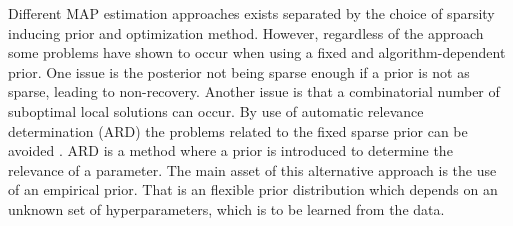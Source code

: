 Different MAP estimation approaches exists separated by the choice of sparsity inducing prior and optimization method. 
However, regardless of the approach some problems have shown to occur when using a fixed and algorithm-dependent prior. 
One issue is the posterior not being sparse enough if a prior is not as sparse, leading to non-recovery. 
Another issue is that a combinatorial number of suboptimal local solutions can occur.
By use of automatic relevance determination (ARD) the problems related to the fixed sparse prior can be avoided \cite[p. 20]{phd_wipf}. 
ARD is a method where a prior is introduced to determine the relevance of a parameter. 
The main asset of this alternative approach is the use of an empirical prior. 
That is an flexible prior distribution which depends on an unknown set of hyperparameters, which is to be learned from the data.
 
